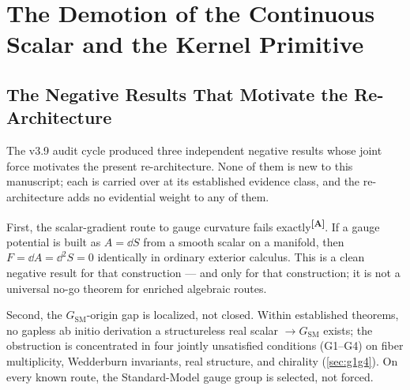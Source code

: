 \documentclass[12pt,a4paper,twoside]{article}
\theoremstyle{plain}
\theoremstyle{definition}
\theoremstyle{remark}
\newcommand{\catmark}[1]{\textsuperscript{\textsf{\textbf{[#1]}}}}
\begin{document}

\section{The Demotion of the Continuous Scalar and the Kernel Primitive}
\label{sec:demotion}

\subsection{The Negative Results That Motivate the Re-Architecture}
\label{subsec:negative-results}

The v3.9 audit cycle produced three independent negative results whose
joint force motivates the present re-architecture. None of them is new to
this manuscript; each is carried over at its established evidence class, and the
re-architecture adds no evidential weight to any of them.

First, the scalar-gradient route to gauge curvature fails
exactly\catmark{A}. If a gauge potential is built as $A = \dd S$ from a
smooth scalar on a manifold, then $F = \dd A = \dd^2 S = 0$ identically in
ordinary exterior calculus. This is a clean negative result for that
construction --- and only for that construction; it is not a universal
no-go theorem for enriched algebraic routes.

Second, the $G_{\mathrm{SM}}$-origin gap is localized, not closed. Within
established theorems, no gapless ab initio derivation
a structureless real scalar $\to G_{\mathrm{SM}}$ exists; the obstruction is concentrated in four
jointly unsatisfied conditions (G1--G4) on fiber multiplicity, Wedderburn
invariants, real structure, and chirality
(\cref{sec:g1g4}). On every known route, the Standard-Model gauge group is
selected, not forced.
\end{document}
